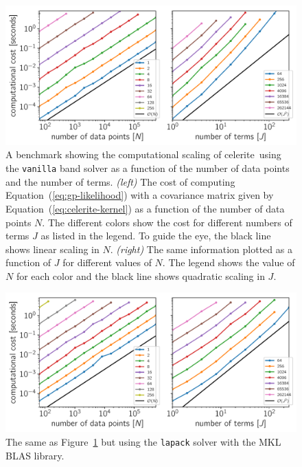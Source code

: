 \documentclass[manuscript, letterpaper]{aastex6}
\newcommand{\project}[1]{\textsf{#1}}
\newcommand{\celerite}{\project{celerite}}
\newcommand{\figureref}[1]{\ref{fig:#1}}
\newcommand{\Figure}[1]{Figure~\figureref{#1}}
\newcommand{\figurelabel}[1]{\label{fig:#1}}
\renewcommand{\eqref}[1]{\ref{eq:#1}}
\newcommand{\Eq}[1]{Equation~(\eqref{#1})}
\newcommand{\eq}[1]{\Eq{#1}}
\begin{document}
\begin{figure}[!htbp]
\begin{center}
\includegraphics[width=\textwidth]{figures/benchmark_darwin.pdf}
\caption{A benchmark showing the computational scaling of \celerite\ using the
    \texttt{vanilla} band solver as a function of the number of data points
    and the number of terms.
    \emph{(left)} The cost of computing \eq{gp-likelihood} with a covariance
    matrix given by \eq{celerite-kernel} as a function of the number of data
    points $N$.
    The different colors show the cost for different numbers of terms $J$ as
    listed in the legend.
    To guide the eye, the black line shows linear scaling in $N$.
    \emph{(right)} The same information plotted as a function of $J$ for
    different values of $N$.
    The legend shows the value of $N$ for each color and the black line shows
    quadratic scaling in $J$.
    \figurelabel{benchmark}}
\end{center}
\end{figure}

\begin{figure}[!htbp]
\begin{center}
\includegraphics[width=\textwidth]{figures/benchmark_darwin_lapack.pdf}
\caption{The same as \Figure{benchmark} but using the \texttt{lapack} solver
    with the \project{MKL} \project{BLAS} library.
    \figurelabel{benchmark-lapack}}
\end{center}
\end{figure}
\end{document}
